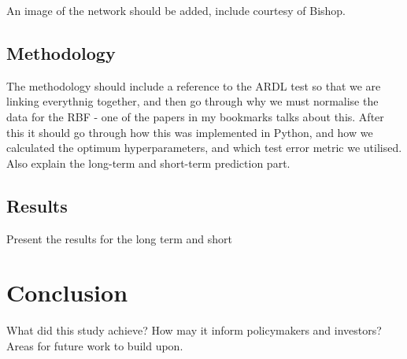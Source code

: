 \documentclass[12pt,a4paper]{article}
\begin{document}
An image of the network should be added, include courtesy of Bishop.

\subsection{Methodology}

The methodology should include a reference to the ARDL test
so that we are linking everythnig together, and then go through why we must normalise the data for the RBF
- one of the papers in my bookmarks talks about this. After this it should 
go through how this was implemented in Python, and how we calculated the
optimum hyperparameters, and which test error metric we utilised. Also explain
the long-term and short-term prediction part.

\subsection{Results}

Present the results for the long term and short

\section{Conclusion}

What did this study achieve?
How may it inform policymakers and investors?
Areas for future work to build upon.


\end{document}
